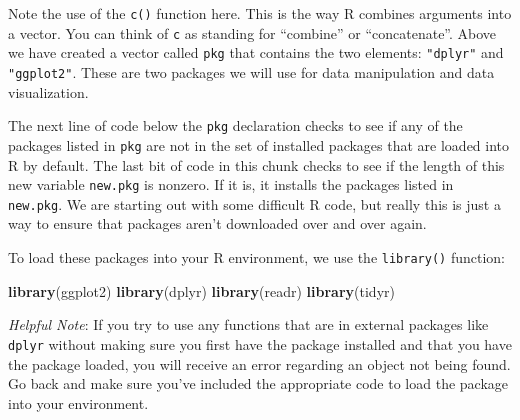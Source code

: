 \documentclass[twoside, 12pt]{article}
\newenvironment{Shaded}{\begin{snugshade}}{\end{snugshade}}
\newcommand{\KeywordTok}[1]{\textcolor[rgb]{0.13,0.29,0.53}{\textbf{{#1}}}}
\newcommand{\DataTypeTok}[1]{\textcolor[rgb]{0.13,0.29,0.53}{{#1}}}
\newcommand{\StringTok}[1]{\textcolor[rgb]{0.31,0.60,0.02}{{#1}}}
\newcommand{\NormalTok}[1]{{#1}}
\begin{document}
\begin{Shaded}
\end{Shaded}

Note the use of the \texttt{c()} function here. This is the way R
combines arguments into a vector. You can think of \texttt{c} as
standing for ``combine'' or ``concatenate''. Above we have created a
vector called \texttt{pkg} that contains the two elements:
\texttt{"dplyr"} and \texttt{"ggplot2"}. These are two packages we will
use for data manipulation and data visualization.

The next line of code below the \texttt{pkg} declaration checks to see
if any of the packages listed in \texttt{pkg} are not in the set of
installed packages that are loaded into R by default. The last bit of
code in this chunk checks to see if the length of this new variable
\texttt{new.pkg} is nonzero. If it is, it installs the packages listed
in \texttt{new.pkg}. We are starting out with some difficult R code, but
really this is just a way to ensure that packages aren't downloaded over
and over again.

To load these packages into your R environment, we use the
\texttt{library()} function:

\begin{Shaded}
\begin{Highlighting}[]
\KeywordTok{library}\NormalTok{(ggplot2)}
\KeywordTok{library}\NormalTok{(dplyr)}
\KeywordTok{library}\NormalTok{(readr)}
\KeywordTok{library}\NormalTok{(tidyr)}
\end{Highlighting}
\end{Shaded}

\emph{Helpful Note}: If you try to use any functions that are in
external packages like \texttt{dplyr} without making sure you first have
the package installed and that you have the package loaded, you will
receive an error regarding an object not being found. Go back and make
sure you've included the appropriate code to load the package into your
environment.
\end{document}
